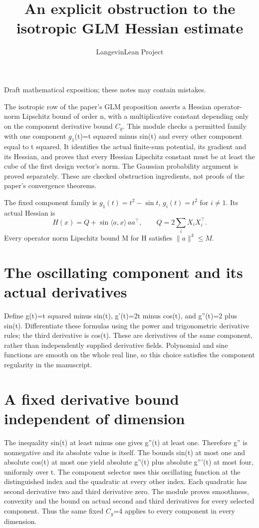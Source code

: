 \documentclass[11pt,a4paper]{article}
\title{\texorpdfstring{An explicit obstruction to the isotropic GLM Hessian estimate}{An explicit obstruction to the isotropic GLM Hessian estimate}}
\author{LangevinLean Project}
\date{}
\begin{document}
\maketitle
Draft mathematical exposition; these notes may contain mistakes.


The isotropic row of the paper's GLM proposition asserts a Hessian operator-norm Lipschitz bound of order n, with a multiplicative constant depending only on the component derivative bound \(C_g\). This module checks a permitted family with one component \(g_1\)(t)=t squared minus sin(t) and every other component equal to t squared. It identifies the actual finite-sum potential, its gradient and its Hessian, and proves that every Hessian Lipschitz constant must be at least the cube of the first design vector's norm. The Gaussian probability argument is proved separately. These are checked obstruction ingredients, not proofs of the paper's convergence theorems.



The fixed component family is \(g_1(t)=t^2-\sin t\), \(g_i(t)=t^2\) for \(i\ne1\). Its actual Hessian is \[H(x)=Q+\sin\langle a,x\rangle\,aa^\top,\qquad Q=2\sum_iX_iX_i^\top.\] Every operator norm Lipschitz bound M for H satisfies \(\|a\|^3\le M\).


\section{\texorpdfstring{The oscillating component and its actual derivatives}{The oscillating component and its actual derivatives}}


Define g(t)=t squared minus sin(t), g'(t)=2t minus cos(t), and g''(t)=2 plus sin(t). Differentiate these formulas using the power and trigonometric derivative rules; the third derivative is cos(t). These are derivatives of the same component, rather than independently supplied derivative fields. Polynomial and sine functions are smooth on the whole real line, so this choice satisfies the component regularity in the manuscript.


\section{\texorpdfstring{A fixed derivative bound independent of dimension}{A fixed derivative bound independent of dimension}}


The inequality sin(t) at least minus one gives g''(t) at least one. Therefore g'' is nonnegative and its absolute value is itself. The bounds sin(t) at most one and absolute cos(t) at most one yield absolute g''(t) plus absolute g'''(t) at most four, uniformly over t. The component selector uses this oscillating function at the distinguished index and the quadratic at every other index. Each quadratic has second derivative two and third derivative zero. The module proves smoothness, convexity and the bound on actual second and third derivatives for every selected component. Thus the same fixed \(C_g\)=4 applies to every component in every dimension.
\end{document}

